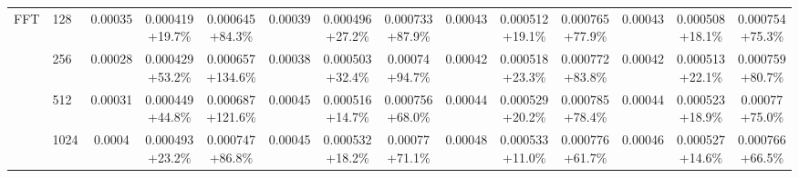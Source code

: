 \documentclass[acmlarge]{acmart}
\begin{document}
\begin{table}[htbp]
\begin{tabular}{llcccccccccccc}
\midrule
\multirow{7}{*}{FFT} & 128 & 0.00035 & \makecell{0.000419\\{\scriptsize +19.7\%}} & \makecell{0.000645\\{\scriptsize +84.3\%}} & 0.00039 & \makecell{0.000496\\{\scriptsize +27.2\%}} & \makecell{0.000733\\{\scriptsize +87.9\%}} & 0.00043 & \makecell{0.000512\\{\scriptsize +19.1\%}} & \makecell{0.000765\\{\scriptsize +77.9\%}} & 0.00043 & \makecell{0.000508\\{\scriptsize +18.1\%}} & \makecell{0.000754\\{\scriptsize +75.3\%}} \\
 & 256 & 0.00028 & \makecell{0.000429\\{\scriptsize +53.2\%}} & \makecell{0.000657\\{\scriptsize +134.6\%}} & 0.00038 & \makecell{0.000503\\{\scriptsize +32.4\%}} & \makecell{0.00074\\{\scriptsize +94.7\%}} & 0.00042 & \makecell{0.000518\\{\scriptsize +23.3\%}} & \makecell{0.000772\\{\scriptsize +83.8\%}} & 0.00042 & \makecell{0.000513\\{\scriptsize +22.1\%}} & \makecell{0.000759\\{\scriptsize +80.7\%}} \\
 & 512 & 0.00031 & \makecell{0.000449\\{\scriptsize +44.8\%}} & \makecell{0.000687\\{\scriptsize +121.6\%}} & 0.00045 & \makecell{0.000516\\{\scriptsize +14.7\%}} & \makecell{0.000756\\{\scriptsize +68.0\%}} & 0.00044 & \makecell{0.000529\\{\scriptsize +20.2\%}} & \makecell{0.000785\\{\scriptsize +78.4\%}} & 0.00044 & \makecell{0.000523\\{\scriptsize +18.9\%}} & \makecell{0.00077\\{\scriptsize +75.0\%}} \\
 & 1024 & 0.0004 & \makecell{0.000493\\{\scriptsize +23.2\%}} & \makecell{0.000747\\{\scriptsize +86.8\%}} & 0.00045 & \makecell{0.000532\\{\scriptsize +18.2\%}} & \makecell{0.00077\\{\scriptsize +71.1\%}} & 0.00048 & \makecell{0.000533\\{\scriptsize +11.0\%}} & \makecell{0.000776\\{\scriptsize +61.7\%}} & 0.00046 & \makecell{0.000527\\{\scriptsize +14.6\%}} & \makecell{0.000766\\{\scriptsize +66.5\%}} \\

\end{tabular}
\end{table}
\end{document}
